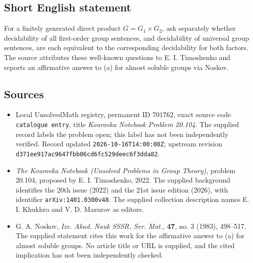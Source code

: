 \documentclass[11pt]{article}
\begin{document}
\subsection{Short English statement}
For a finitely generated direct product \(G=G_1\times G_2\), ask separately whether decidability of all first-order group sentences, and decidability of universal group sentences, are each equivalent to the corresponding decidability for both factors. The source attributes these well-known questions to E. I. Timoshenko and reports an affirmative answer to (a) for almost soluble groups via Noskov.
\subsection{Sources}
\begin{itemize}
\item Local UnsolvedMath registry, permanent ID \(701762\), exact source code \texttt{catalogue entry}, title \emph{Kourovka Notebook Problem 20.104}. The supplied record labels the problem open; this label has not been independently verified. Record updated \texttt{2026-10-16T14:00:00Z}; upstream revision \texttt{d371ee917ac9647fbb06cd6fc529deec6f3dda82}.
\item \emph{The Kourovka Notebook (Unsolved Problems in Group Theory)}, problem 20.104, proposed by E. I. Timoshenko, 2022. The supplied background identifies the 20th issue (2022) and the 21st issue edition (2026), with identifier \texttt{arXiv:1401.0300v48}. The supplied collection description names E. I. Khukhro and V. D. Mazurov as editors.
\item G. A. Noskov, \emph{Izv. Akad. Nauk SSSR, Ser. Mat.}, \textbf{47}, no. 3 (1983), 498--517. The supplied statement cites this work for the affirmative answer to (a) for almost soluble groups. No article title or URL is supplied, and the cited implication has not been independently checked.
\end{itemize}
\end{document}
